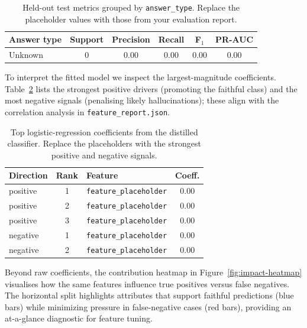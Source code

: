 \documentclass[11pt]{article}
\begin{document}
\begin{table}[ht]
  \centering
  \renewcommand{\arraystretch}{1.15}
  \begin{tabular}{@{}lccccc@{}}
    \toprule
    \textbf{Answer type} & \textbf{Support} & \textbf{Precision} & \textbf{Recall} & \textbf{F$_1$} & \textbf{PR-AUC} \\
    \midrule
    Unknown & 0 & 0.00 & 0.00 & 0.00 & 0.00 \\
    \bottomrule
  \end{tabular}
  \caption{Held-out test metrics grouped by \texttt{answer\_type}. Replace the placeholder values with those from your evaluation report.}
  \label{tab:test-answer-type}
\end{table}

To interpret the fitted model we inspect the largest-magnitude coefficients. Table~\ref{tab:top-features} lists the strongest positive drivers (promoting the faithful class) and the most negative signals (penalising likely hallucinations); these align with the correlation analysis in \texttt{feature\_report.json}.

\begin{table}[ht]
  \centering
  \renewcommand{\arraystretch}{1.1}
  \begin{tabular}{@{}lclc@{}}
    \toprule
    \textbf{Direction} & \textbf{Rank} & \textbf{Feature} & \textbf{Coeff.} \\
    \midrule
    positive & 1 & \texttt{feature\_placeholder} & 0.00 \\
    positive & 2 & \texttt{feature\_placeholder} & 0.00 \\
    positive & 3 & \texttt{feature\_placeholder} & 0.00 \\
    negative & 1 & \texttt{feature\_placeholder} & 0.00 \\
    negative & 2 & \texttt{feature\_placeholder} & 0.00 \\
    \bottomrule
  \end{tabular}
  \caption{Top logistic-regression coefficients from the distilled classifier. Replace the placeholders with the strongest positive and negative signals.}
  \label{tab:top-features}
\end{table}

Beyond raw coefficients, the contribution heatmap in Figure~\ref{fig:impact-heatmap} visualises how the same features influence true positives versus false negatives. The horizontal split highlights attributes that support faithful predictions (blue bars) while minimizing pressure in false-negative cases (red bars), providing an at-a-glance diagnostic for feature tuning.
\end{document}
